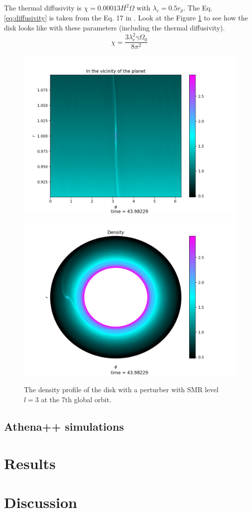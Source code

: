 \documentclass[twocolumn]{aastex631}
\begin{document}
The thermal diffusivity is $\chi=0.00013 H^2\Omega$ with $\lambda_c=0.5r_p$. The Eq. \ref{eq:diffusivity} is taken from the Eq. 17 in \citet{hankla20}. 
Look at the Figure \ref{fig:den_smr3} to see how the disk looks like with these parameters (including the thermal diffusivity). 
\begin{equation}\label{eq:diffusivity}
    \chi=\frac{3\lambda_c^2\gamma\Omega_0}{8\pi^2}
\end{equation}

\begin{figure}
\centering
	\includegraphics[width=0.48\columnwidth]{smr3zoomeddisk.png}
	\includegraphics[width=0.48\columnwidth]{smr3disk.png}
    \caption{The density profile of the disk with a perturber with SMR level $l=3$ at the 7th global orbit.}
    \label{fig:den_smr3}
\end{figure}





\subsection{Athena++ simulations}

\section{Results}
\label{sec:results}

\section{Discussion} 
\label{sec:conclusion}


\end{document}
